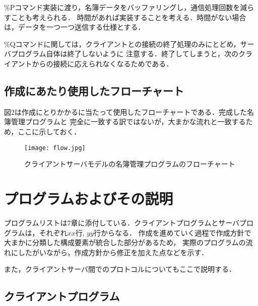 \documentclass[a4paper,11pt]{jarticle}
\begin{document}
\%Pコマンド実装に渡り，名簿データをバッファリングし，通信処理回数を減らすことも考えられる．
時間があれば実装することを考える．時間がない場合は，データを一つ一つ送信する仕様とする．


\%Qコマンドに関しては，クライアントとの接続の終了処理のみにとどめ，サーバプログラム自体は終了しないように
注意する．終了してしまうと，次のクライアントからの接続に応えられなくなるためである．

\subsection{作成にあたり使用したフローチャート} \label{sec:command}
図2は作成にとりかかるに当たって使用したフローチャートである．完成した名簿管理プログラムと
完全に一致する訳ではないが，大まかな流れと一致するため，ここに示しておく．

\begin{figure}[htbp]
\begin{center}
\caption{クライアントサーバモデルの名簿管理プログラムのフローチャート}
\texttt{[image: flow.jpg]}

\end{center}
\end{figure}
\section{プログラムおよびその説明}

プログラムリストは$7$章に添付している．クライアントプログラムとサーバプログラムは，それぞれ$xx$行, 
$yy$行からなる．
作成を進めていく過程で作成方針で大まかに分類した構成要素が統合した部分があるため，
実際のプログラムの流れにしたがいながら，作成方針から修正を加えた点などを示す．

また，クライアントサーバ間でのプロトコルについてもここで説明する．

\subsection{クライアントプログラム}
\end{document}
